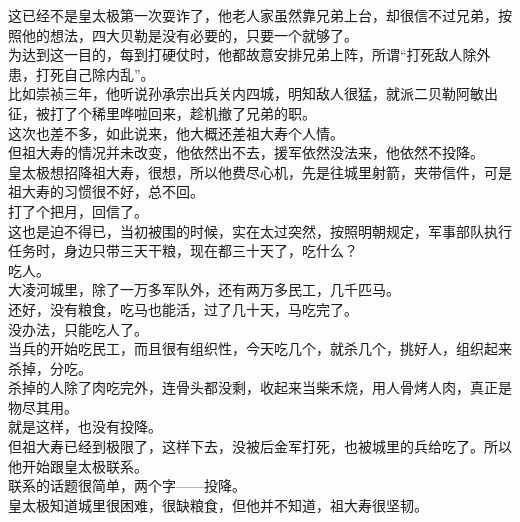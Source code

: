 \begin{multicols}{\theparacolNo}
这已经不是皇太极第一次耍诈了，他老人家虽然靠兄弟上台，却很信不过兄弟，按照他的想法，四大贝勒是没有必要的，只要一个就够了。\\

为达到这一目的，每到打硬仗时，他都故意安排兄弟上阵，所谓“打死敌人除外患，打死自己除内乱”。\\

比如崇祯三年，他听说孙承宗出兵关内四城，明知敌人很猛，就派二贝勒阿敏出征，被打了个稀里哗啦回来，趁机撤了兄弟的职。\\

这次也差不多，如此说来，他大概还差祖大寿个人情。\\

但祖大寿的情况并未改变，他依然出不去，援军依然没法来，他依然不投降。\\

皇太极想招降祖大寿，很想，所以他费尽心机，先是往城里射箭，夹带信件，可是祖大寿的习惯很不好，总不回。\\

打了个把月，回信了。\\

这也是迫不得已，当初被围的时候，实在太过突然，按照明朝规定，军事部队执行任务时，身边只带三天干粮，现在都三十天了，吃什么？\\

吃人。\\

大凌河城里，除了一万多军队外，还有两万多民工，几千匹马。\\

还好，没有粮食，吃马也能活，过了几十天，马吃完了。\\

没办法，只能吃人了。\\

当兵的开始吃民工，而且很有组织性，今天吃几个，就杀几个，挑好人，组织起来杀掉，分吃。\\

杀掉的人除了肉吃完外，连骨头都没剩，收起来当柴禾烧，用人骨烤人肉，真正是物尽其用。\\

就是这样，也没有投降。\\

但祖大寿已经到极限了，这样下去，没被后金军打死，也被城里的兵给吃了。所以他开始跟皇太极联系。\\

联系的话题很简单，两个字——投降。\\

皇太极知道城里很困难，很缺粮食，但他并不知道，祖大寿很坚韧。\\


\end{multicols}
